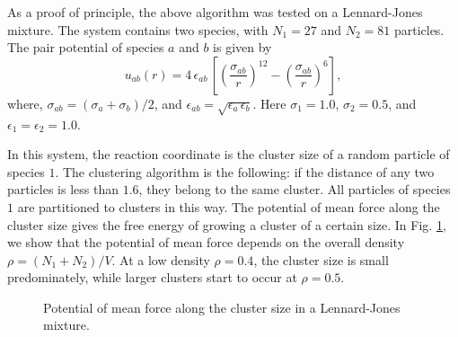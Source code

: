 \documentclass[notitlepage, preprint,superscriptaddress]{revtex4-1}
\begin{document}
%
As a proof of principle,
the above algorithm was tested on a Lennard-Jones mixture.
%
The system contains two species,
with $N_1 = 27$ and $N_2 = 81$ particles.
%
The pair potential of species $a$ and $b$ is given by
%
\[
  u_{ab}(r)
=
  4 \, \epsilon_{ab} \,
  \left[
    \left(
      \frac{ \sigma_{ab} } { r }
    \right)^{12}
    -
    \left(
      \frac{ \sigma_{ab} } { r }
    \right)^{6}
  \right],
\]
%
where,
$\sigma_{ab} = (\sigma_a + \sigma_b)/2$,
%
and
$\epsilon_{ab} = \sqrt{\epsilon_a \, \epsilon_b}$.
%
Here
$\sigma_1 = 1.0$,
$\sigma_2 = 0.5$,
and
$\epsilon_1 = \epsilon_2 = 1.0$.



In this system,
the reaction coordinate is the cluster size
of a random particle of species $1$.
%
The clustering algorithm is the following:
if the distance of any two particles is less than $1.6$,
they belong to the same cluster.
%
All particles of species $1$
are partitioned to clusters in this way.
%
The potential of mean force along the cluster size
gives the free energy of growing a cluster of a certain size.
%
In Fig. \ref{fig:ljmix1},
we show that the potential of mean force
depends on the overall density $\rho = (N_1 + N_2)/V$.
%
At a low density $\rho = 0.4$,
the cluster size is small predominately,
while larger clusters start to occur at $\rho = 0.5$.


\begin{figure}[h]
  \caption{
    \label{fig:ljmix1}
    Potential of mean force along the cluster size
    in a Lennard-Jones mixture.
  }
\end{figure}




\end{document}
